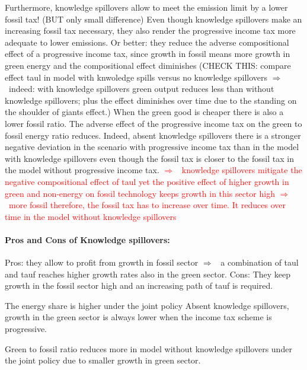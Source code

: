 \documentclass[12pt]{article}
\newcommand{\ar}{$\Rightarrow$ \ }
\newcommand{\tr}[1]{\textcolor{red}{#1}}
\begin{document}
 Furthermore, knowledge spillovers allow to meet the emission limit by a lower fossil tax! (BUT only small difference) Even though knowledge spillovers make an increasing fossil tax necessary, they also render the progressive income tax more adequate to lower emissions. Or better: they reduce the adverse compositional effect of a progressive income tax, since growth in fossil means more  growth in green energy and the compositional effect diminishes (CHECK THIS: compare effect taul in model with knwoledge spills versus no knowledge spillovers \ar indeed: with knowledge spillovers green output reduces less than without knowledge spillovers; plus the effect diminishes over time due to the standing on the shoulder of giants effect.) When the green good is cheaper there is also a lower fossil ratio. The adverse effect of the progressive income tax on the green to fossil energy ratio reduces. Indeed, absent knowledge spillovers there is a stronger negative deviation in the scenario with progressive income tax than in the model with knowledge spillovers even though the fossil tax is closer to the fossil tax in the model without progressive income tax. 
\tr{ \ar knowledge spillovers mitigate the negative compositional effect of taul yet the positive effect of higher growth in green and non-energy on fossil technology keeps growth in this sector high \ar more fossil therefore, the fossil tax has to increase over time. It reduces over time in the model without knowledge spillovers}

\paragraph{Pros and Cons of Knowledge spillovers:}
Pros: they allow to profit from growth in fossil sector \ar a combination of taul and tauf reaches higher growth rates also in the green sector. 
Cons: They keep growth in the fossil sector high and an increasing path of tauf is required. 
 
 The energy share is higher under the joint policy
 Absent knowledge spillovers, growth in the green sector is always lower when the income tax scheme is progressive. 
 
Green to fossil ratio reduces more in model without knowledge spillovers under the joint policy due to smaller growth in green sector. 
\end{document}
